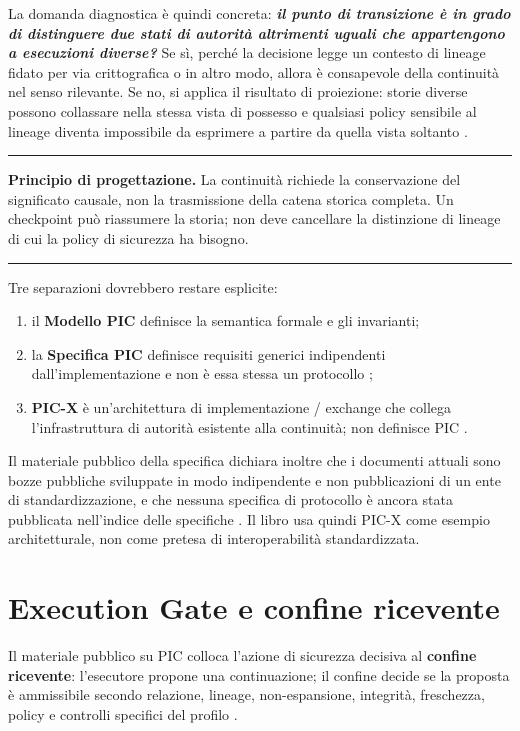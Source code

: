 \documentclass[10pt,oneside,openany]{book}
\newcommand{\term}[1]{\textbf{#1}}
\newcommand{\principle}[1]{%
  \vspace{4pt}
  \noindent\begin{minipage}{\linewidth}
  \hrule\vspace{5pt}
  \small\sffamily\raggedright\textbf{Principio di progettazione.} #1
  \vspace{5pt}\hrule
  \end{minipage}\vspace{4pt}
}
\begin{document}
La domanda diagnostica è quindi concreta: \textbf{\emph{il punto di transizione è in grado di distinguere due stati di autorità altrimenti uguali che appartengono a esecuzioni diverse?}} Se sì, perché la decisione legge un contesto di lineage fidato per via crittografica o in altro modo, allora è consapevole della continuità nel senso rilevante. Se no, si applica il risultato di proiezione: storie diverse possono collassare nella stessa vista di possesso e qualsiasi policy sensibile al lineage diventa impossibile da esprimere a partire da quella vista soltanto \cite{gallo2026pic}.

\principle{La continuità richiede la conservazione del significato causale, non la trasmissione della catena storica completa. Un checkpoint può riassumere la storia; non deve cancellare la distinzione di lineage di cui la policy di sicurezza ha bisogno.}

Tre separazioni dovrebbero restare esplicite:

\begin{enumerate}
\item il \textbf{Modello PIC} definisce la semantica formale e gli invarianti;
\item la \textbf{Specifica PIC} definisce requisiti generici indipendenti dall'implementazione e non è essa stessa un protocollo \cite{picspec};
\item \textbf{PIC-X} è un'architettura di implementazione / exchange che collega l'infrastruttura di autorità esistente alla continuità; non definisce PIC \cite{picimpl}.
\end{enumerate}

Il materiale pubblico della specifica dichiara inoltre che i documenti attuali sono bozze pubbliche sviluppate in modo indipendente e non pubblicazioni di un ente di standardizzazione, e che nessuna specifica di protocollo è ancora stata pubblicata nell'indice delle specifiche \cite{picspec,picprotocols}. Il libro usa quindi PIC-X come esempio architetturale, non come pretesa di interoperabilità standardizzata.

\chapter{Execution Gate e confine ricevente}

Il materiale pubblico su PIC colloca l'azione di sicurezza decisiva al \term{confine ricevente}: l'esecutore propone una continuazione; il confine decide se la proposta è ammissibile secondo relazione, lineage, non-espansione, integrità, freschezza, policy e controlli specifici del profilo \cite{picwhy}.
\end{document}

